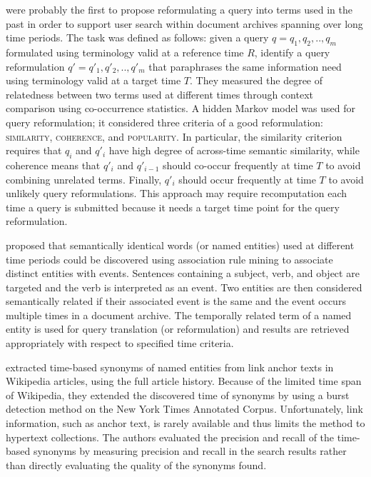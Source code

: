 \documentclass[output=paper]{langsci/langscibook}
\begin{document}
\citet{berberichbsw09} were probably the first to propose reformulating a query into terms used in the past in order to support user search within document archives spanning over long time periods. The task was defined as follows: given a query $q = {q_1, q_2,..,q_m}$ formulated using terminology valid at a reference time $R$, identify a query reformulation $q' = {q'_1, q'_2,..,q'_m}$ that paraphrases the same information need using terminology valid at a target time $T$. They measured the degree of relatedness between two terms used at different times through context comparison using co-occurrence statistics. A hidden Markov model was used for query reformulation; it considered three criteria of a good reformulation: \textsc{similarity}, \textsc{coherence}, and \textsc{popularity}. In particular, the similarity criterion requires that
$q_i$ and $q'_i$ have high degree of across-time semantic similarity, while coherence means that $q'_i$ and $q'_{i-1}$  should co-occur frequently at time $T$ to avoid combining unrelated terms. Finally, $q'_i$ should occur frequently at time $T$ to avoid unlikely query reformulations.
This approach may require recomputation each time a query is submitted because it needs a target time point for the query reformulation. 


\begin{sloppypar}
\citet{kaluarachchi2010incorporating} proposed that semantically identical words (or named entities) used at different time periods could be discovered using association rule mining to associate distinct entities with events. Sentences containing a subject, verb, and object 
are targeted and the verb is interpreted as an event. Two entities are then considered semantically related if their associated event is the same and the event occurs multiple times in a document archive. The temporally related term of a named entity is used for query translation (or reformulation) and results are retrieved appropriately with respect to specified time criteria. 
\end{sloppypar}

\citet{kanhabuan10} extracted time-based synonyms of named entities from link anchor texts in Wikipedia articles, using the full article history. Because of the limited time span of Wikipedia, they extended the discovered time of synonyms by using a burst detection method on the New York Times Annotated Corpus. Unfortunately, link information, such as anchor text, is rarely available and thus limits the method to hypertext collections. The authors evaluated the precision and recall of the time-based synonyms by measuring precision and recall in the search results rather than directly evaluating the quality of the synonyms found. 
\end{document}
